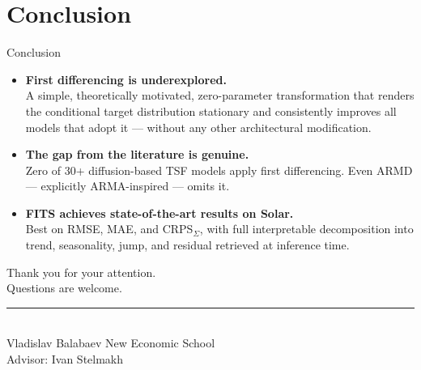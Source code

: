 \documentclass[aspectratio=169,11pt]{beamer}
\begin{document}

\section{Conclusion}

\begin{frame}{Conclusion}
  \begin{itemize}
    \setlength\itemsep{10pt}

    \item \textbf{First differencing is underexplored.}\\
          A simple, theoretically motivated, zero-parameter transformation
          that renders the conditional target distribution stationary and
          consistently improves all models that adopt it — without any
          other architectural modification.

    \item \textbf{The gap from the literature is genuine.}\\
          Zero of 30+ diffusion-based TSF models apply first differencing.
          Even ARMD — explicitly ARMA-inspired — omits it.

    \item \textbf{FITS achieves state-of-the-art results on Solar.}\\
          Best on RMSE, MAE, and CRPS$_\Sigma$, with full interpretable
          decomposition into trend, seasonality, jump, and residual
          retrieved at inference time.

  \end{itemize}
\end{frame}

\begin{frame}[plain]
  \centering
  \vspace{1.8cm}
  {\Large\color{nesblue} Thank you for your attention.}\\[14pt]
  {\normalsize Questions are welcome.}\\[22pt]
  \rule{0.5\textwidth}{0.4pt}\\[10pt]
  {\small
    Vladislav Balabaev \quad\textbar\quad New Economic School\\[3pt]
    Advisor: Ivan Stelmakh
  }
\end{frame}




\end{document}
